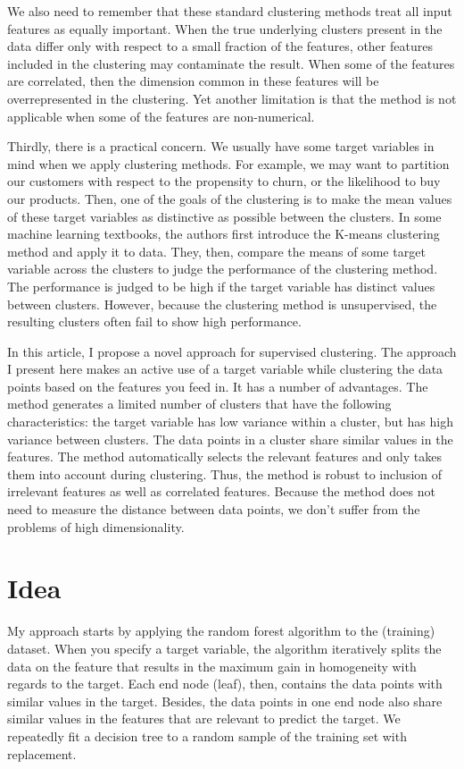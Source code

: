 \documentclass{article}
\begin{document}
We also need to remember that these standard clustering methods treat all input features as equally important. When the true underlying clusters present in the data differ only with respect to a small fraction of the features, other features included in the clustering may contaminate the result. When some of the features are correlated, then the dimension common in these features will be overrepresented in the clustering. Yet another limitation is that the method is not applicable when some of the features are non-numerical.

Thirdly, there is a practical concern. We usually have some target variables in mind when we apply clustering methods. For example, we may want to partition our customers with respect to the propensity to churn, or the likelihood to buy our products. Then, one of the goals of the clustering is to make the mean values of these target variables as distinctive as possible between the clusters. In some machine learning textbooks, the authors first introduce the K-means clustering method and apply it to data. They, then, compare the means of some target variable across the clusters to judge the performance of the clustering method. The performance is judged to be high if the target variable has distinct values between clusters. However, because the clustering method is unsupervised, the resulting clusters often fail to show high performance.

In this article, I propose a novel approach for supervised clustering. The approach I present here makes an active use of a target variable while clustering the data points based on the features you feed in. It has a number of advantages. The method generates a limited number of clusters that have the following characteristics: the target variable has low variance within a cluster, but has high variance between clusters. The data points in a cluster share similar values in the features. The method automatically selects the relevant features and only takes them into account during clustering. Thus, the method is robust to inclusion of irrelevant features as well as correlated features. Because the method does not need to measure the distance between data points, we don't suffer from the problems of high dimensionality.

\section{Idea}
My approach starts by applying the random forest algorithm to the (training) dataset. When you specify a target variable, the algorithm iteratively splits the data on the feature that results in the maximum gain in homogeneity with regards to the target. Each end node (leaf), then, contains the data points with similar values in the target. Besides, the data points in one end node also share similar values in the features that are relevant to predict the target. We repeatedly fit a decision tree to a random sample of the training set with replacement.
\end{document}
